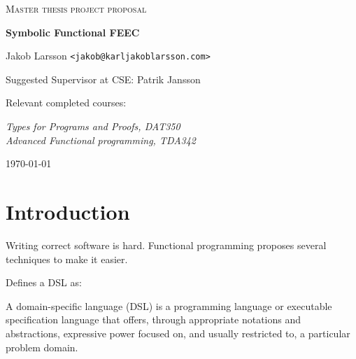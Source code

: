 \documentclass{scrartcl}
\begin{document}
\begin{titlepage}

\centering
{\scshape\LARGE Master thesis project proposal}

\vspace{0.5cm}
{\huge\bfseries Symbolic Functional FEEC}

\vspace{2cm}
{\Large Jakob Larsson \texttt{<jakob@karljakoblarsson.com>}}

\vspace{1.0cm}
{\large Suggested Supervisor at CSE: Patrik Jansson }


\vspace{1.5cm}
{\large Relevant completed courses:}

{\itshape
Types for Programs and Proofs, DAT350 \\
Advanced Functional programming, TDA342 \\
}


\vfill
{\large \today}

\end{titlepage}


%
%

\section{Introduction}


Writing correct software is hard.
Functional programming proposes several techniques to make it easier.

\cite{van2000domain} Defines a DSL as:

\begin{displayquote}
  A domain-specific language (DSL) is a programming language or executable
  specification language that offers, through appropriate notations and
  abstractions, expressive power focused on, and usually restricted to,
  a particular problem domain.
\end{displayquote}
\end{document}
